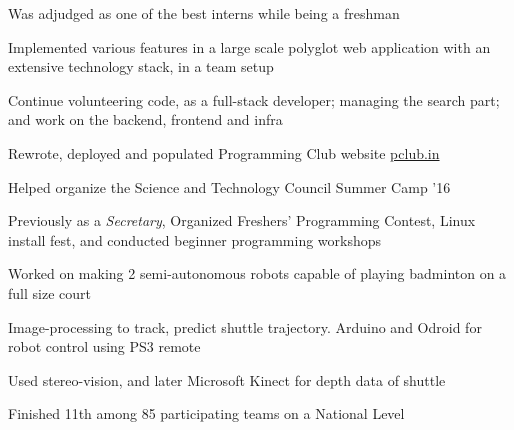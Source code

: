 \documentclass[a4paper]{deedy-resume} %
\begin{document}
\begin{minipage}[t]{0.66\textwidth}
  \runsubsection{}

  \begin{tightitemize}
  \item Was adjudged as one of the best interns while being a freshman
  \item Implemented various features in a large scale polyglot web
    application with an extensive technology stack, in a team setup
  \item Continue volunteering code, as a full-stack developer;
    managing the search part; and work on the backend, frontend and infra
  \end{tightitemize}

  \sectionspace

  \runsubsection{}
  \begin{tightitemize}
  \item Rewrote, deployed and populated Programming Club website \href{https://pclub.in}{pclub.in}
  \item Helped organize the Science and Technology Council Summer Camp
    '16
  \item Previously as a \textit{Secretary}, Organized Freshers'
    Programming Contest, Linux install fest, and conducted beginner
    programming workshops
  \end{tightitemize}

  \sectionspace

  \runsubsection{}
  \begin{tightitemize}
  \item Worked on making 2 semi-autonomous robots capable of playing badminton on a full size court
  \item Image-processing to track, predict shuttle trajectory. Arduino
    and Odroid for robot control using PS3 remote
  \item Used stereo-vision, and later Microsoft Kinect for depth data
    of shuttle
  \item Finished 11th among 85 participating teams on a National Level
  \end{tightitemize}

  \sectionspace


\end{minipage}
\end{document}
